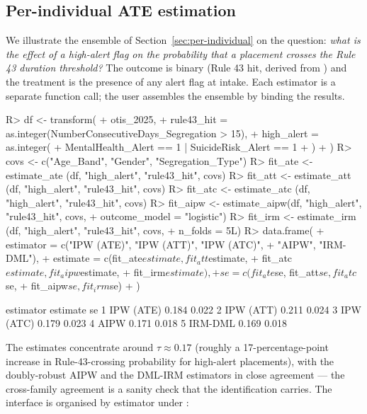 \documentclass[article,shortnames,nojss]{jss}
\begin{document}
\subsection{Per-individual ATE estimation}

We illustrate the ensemble of
Section~\ref{sec:per-individual} on the question: \emph{what is
the effect of a high-alert flag on the probability that a
placement crosses the Rule 43 duration threshold?}  The outcome
is binary (Rule 43 hit, derived from ) and the
treatment is the presence of any alert flag at intake.  Each
estimator is a separate function call; the user assembles the
ensemble by binding the results.

\begin{CodeChunk}
\begin{CodeInput}
R> df <- transform(
+    otis_2025,
+    rule43_hit = as.integer(NumberConsecutiveDays_Segregation > 15),
+    high_alert = as.integer(
+      MentalHealth_Alert == 1 | SuicideRisk_Alert == 1
+    )
+  )
R> covs <- c("Age_Band", "Gender", "Segregation_Type")
R> fit_ate  <- estimate_ate (df, "high_alert", "rule43_hit", covs)
R> fit_att  <- estimate_att (df, "high_alert", "rule43_hit", covs)
R> fit_atc  <- estimate_atc (df, "high_alert", "rule43_hit", covs)
R> fit_aipw <- estimate_aipw(df, "high_alert", "rule43_hit", covs,
+                             outcome_model = "logistic")
R> fit_irm  <- estimate_irm (df, "high_alert", "rule43_hit", covs,
+                             n_folds = 5L)
R> data.frame(
+    estimator = c("IPW (ATE)", "IPW (ATT)", "IPW (ATC)",
+                  "AIPW", "IRM-DML"),
+    estimate  = c(fit_ate$estimate, fit_att$estimate,
+                  fit_atc$estimate, fit_aipw$estimate,
+                  fit_irm$estimate),
+    se        = c(fit_ate$se, fit_att$se, fit_atc$se,
+                  fit_aipw$se, fit_irm$se)
+  )
\end{CodeInput}
\begin{CodeOutput}
   estimator  estimate     se
1  IPW (ATE)     0.184  0.022
2  IPW (ATT)     0.211  0.024
3  IPW (ATC)     0.179  0.023
4       AIPW     0.171  0.018
5    IRM-DML     0.169  0.018
\end{CodeOutput}
\end{CodeChunk}

The estimates concentrate around $\hat{\tau} \approx 0.17$
(roughly a 17-percentage-point increase in Rule-43-crossing
probability for high-alert placements), with the doubly-robust
AIPW and the DML-IRM estimators in close agreement --- the
cross-family agreement is a sanity check that the identification
carries.  The  interface is organised by
estimator under :
\end{document}
